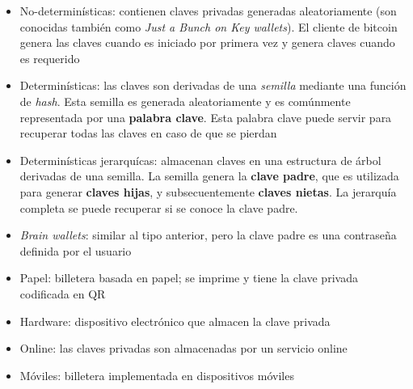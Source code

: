 \begin{itemize}
    \item No-determinísticas: contienen claves privadas generadas aleatoriamente (son conocidas también como \emph{Just a Bunch on Key wallets}). El cliente de bitcoin genera las claves cuando es iniciado por primera vez y genera claves cuando es requerido
    \item Determinísticas: las claves son derivadas de una \emph{semilla} mediante una función de \emph{hash}. Esta semilla es generada aleatoriamente y es comúnmente representada por una \textbf{palabra clave}. Esta palabra clave puede servir para recuperar todas las claves en caso de que se pierdan
    \item Determinísticas jerarquícas: almacenan claves en una estructura de árbol derivadas de una semilla. La semilla genera la \textbf{clave padre}, que es utilizada para generar \textbf{claves hijas}, y subsecuentemente \textbf{claves nietas}. La jerarquía completa se puede recuperar si se conoce la clave padre.
    \item \emph{Brain wallets}: similar al tipo anterior, pero la clave padre es una contraseña definida por el usuario
    \item Papel: billetera basada en papel; se imprime y tiene la clave privada codificada en QR
    \item Hardware: dispositivo electrónico que almacen la clave privada
    \item Online: las claves privadas son almacenadas por un servicio online
    \item Móviles: billetera implementada en dispositivos móviles \autocite{MasteringBlockchainTypeOfWallets}
\end{itemize}



\clearpage
\printbibliography


